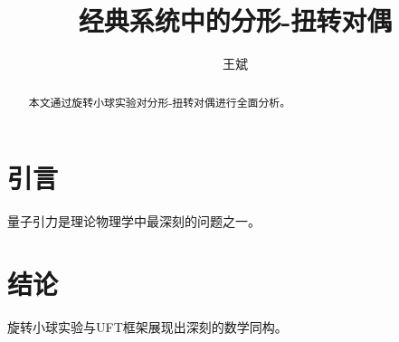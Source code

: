 \documentclass[12pt,a4paper]{article}
\begin{document}
\title{经典系统中的分形-扭转对偶}
\author{王斌}
\maketitle
\begin{abstract}
本文通过旋转小球实验对分形-扭转对偶进行全面分析。
\end{abstract}
\section{引言}
量子引力是理论物理学中最深刻的问题之一。
\section{结论}
旋转小球实验与UFT框架展现出深刻的数学同构。
\end{document}
